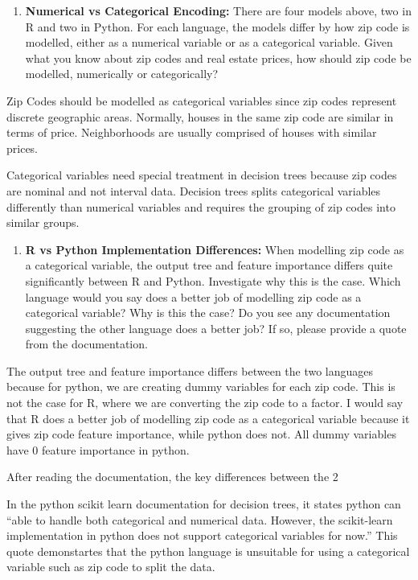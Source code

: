 \documentclass[
  letterpaper,
  DIV=11,
  numbers=noendperiod]{scrartcl}
\providecommand{\tightlist}{%
  \setlength{\itemsep}{0pt}\setlength{\parskip}{0pt}}
\begin{document}
\begin{enumerate}
\def\labelenumi{\arabic{enumi}.}
\tightlist
\item
  \textbf{Numerical vs Categorical Encoding:} There are four models
  above, two in R and two in Python. For each language, the models
  differ by how zip code is modelled, either as a numerical variable or
  as a categorical variable. Given what you know about zip codes and
  real estate prices, how should zip code be modelled, numerically or
  categorically?
\end{enumerate}

Zip Codes should be modelled as categorical variables since zip codes
represent discrete geographic areas. Normally, houses in the same zip
code are similar in terms of price. Neighborhoods are usually comprised
of houses with similar prices.

Categorical variables need special treatment in decision trees because
zip codes are nominal and not interval data. Decision trees splits
categorical variables differently than numerical variables and requires
the grouping of zip codes into similar groups.

\begin{enumerate}
\def\labelenumi{\arabic{enumi}.}
\setcounter{enumi}{1}
\tightlist
\item
  \textbf{R vs Python Implementation Differences:} When modelling zip
  code as a categorical variable, the output tree and feature importance
  differs quite significantly between R and Python. Investigate why this
  is the case. Which language would you say does a better job of
  modelling zip code as a categorical variable? Why is this the case? Do
  you see any documentation suggesting the other language does a better
  job? If so, please provide a quote from the documentation.
\end{enumerate}

The output tree and feature importance differs between the two languages
because for python, we are creating dummy variables for each zip code.
This is not the case for R, where we are converting the zip code to a
factor. I would say that R does a better job of modelling zip code as a
categorical variable because it gives zip code feature importance, while
python does not. All dummy variables have 0 feature importance in
python.

After reading the documentation, the key differences between the 2

In the python scikit learn documentation for decision trees, it states
python can ``able to handle both categorical and numerical data.
However, the scikit-learn implementation in python does not support
categorical variables for now.'' This quote demonstartes that the python
language is unsuitable for using a categorical variable such as zip code
to split the data.
\end{document}

